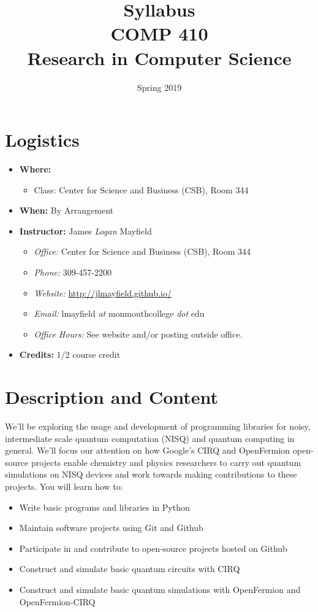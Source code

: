 \documentclass[10pt]{article}
\title{Syllabus \\ COMP 410 \\ Research in Computer Science}
\author{  }
\date{Spring 2019}
\begin{document}
\maketitle

\section{Logistics}
\begin{itemize}
\item \textbf{Where: }
\begin{itemize}
\item Class: Center for Science and Business (CSB), Room 344
\end{itemize}
\item \textbf{When: } By Arrangement
\item \textbf{Instructor: } James \textit{Logan} Mayfield
\begin{itemize}
\item \textit{Office: } Center for Science and Business (CSB), Room 344
\item \textit{Phone: } 309-457-2200 %
\item \textit{Website: } \url{http://jlmayfield.github.io/}
\item \textit{Email: } lmayfield \textit{at} monmouthcollege \textit{dot} edu
\item \textit{Office Hours: }  See website and/or posting outside office.
\end{itemize}
\item \textbf{Credits: }  1/2 course credit
\end{itemize}


\section{Description and Content}

We'll be exploring the usage and development of programming libraries for noisy, intermediate scale quantum computation (NISQ) and quantum computing in general. We'll focus our attention on how Google's CIRQ and OpenFermion open-source projects enable chemistry and physics researchers to carry out quantum simulations on NISQ devices and work towards making contributions to these projects. You will learn how to:
\begin{itemize}
  \item Write basic programs and libraries in Python
  \item Maintain software projects using Git and Github
  \item Participate in and contribute to open-source projects hosted on Github
  \item Construct and simulate basic quantum circuits with CIRQ
  \item Construct and simulate basic quantum simulations with OpenFermion and OpenFermion-CIRQ
\end{itemize}
\end{document}
